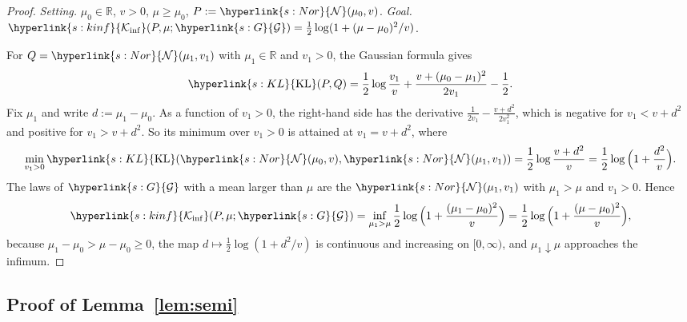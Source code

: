 \documentclass[11pt]{article}
\newcommand{\R}{\mathbb{R}}
\newcommand{\sy}[2]{{\hyperlink{#1}{#2}}}
\newcommand{\KL}{\sy{s:KL}{\mathrm{KL}}}
\newcommand{\Kinf}{\sy{s:kinf}{\mathcal{K}_{\inf}}}
\newcommand{\Nor}{\sy{s:Nor}{\mathcal{N}}}
\newcommand{\Gau}{\sy{s:G}{\mathcal{G}}}
\begin{document}
\begin{proof}
\emph{Setting.} $\mu_0\in\R$, $v>0$, $\mu\ge\mu_0$, $P:=\Nor(\mu_0,v)$. \emph{Goal.}
$\Kinf(P,\mu;\Gau)=\frac12\log(1+(\mu-\mu_0)^2/v)$.

For $Q=\Nor(\mu_1,v_1)$ with $\mu_1\in\R$ and $v_1>0$, the Gaussian formula gives
\begin{equation*}
  \KL(P,Q)=\frac12\log\frac{v_1}{v}+\frac{v+(\mu_0-\mu_1)^2}{2v_1}-\frac12.
\end{equation*}
Fix $\mu_1$ and write $d:=\mu_1-\mu_0$. As a function of $v_1>0$, the right-hand side has the
derivative $\frac1{2v_1}-\frac{v+d^2}{2v_1^2}$, which is negative for $v_1<v+d^2$ and positive for
$v_1>v+d^2$. So its minimum over $v_1>0$ is attained at $v_1=v+d^2$, where
\begin{equation*}
  \min_{v_1>0}\KL(\Nor(\mu_0,v),\Nor(\mu_1,v_1))=\frac12\log\frac{v+d^2}{v}=\frac12\log\Big(1+\frac{d^2}{v}\Big).
\end{equation*}
The laws of $\Gau$ with a mean larger than $\mu$ are the $\Nor(\mu_1,v_1)$ with $\mu_1>\mu$ and $v_1>0$.
Hence
\begin{equation*}
  \Kinf(P,\mu;\Gau)=\inf_{\mu_1>\mu}\frac12\log\Big(1+\frac{(\mu_1-\mu_0)^2}{v}\Big)
  =\frac12\log\Big(1+\frac{(\mu-\mu_0)^2}{v}\Big),
\end{equation*}
because $\mu_1-\mu_0>\mu-\mu_0\ge0$, the map $d\mapsto\frac12\log(1+d^2/v)$ is continuous and
increasing on $[0,\infty)$, and $\mu_1\downarrow\mu$ approaches the infimum.
\end{proof}

\subsection{Proof of Lemma~\ref{lem:semi}}\label{sec:proof-semi}
\end{document}
